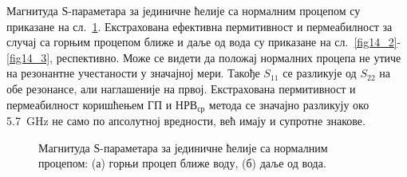 Магнитуда $Ѕ$-параметара за јединичне ћелије са нормалним процепом су приказане на сл.~\ref{fig14_1}. Екстрахована ефективна пермитивност и пермеабилност за случај са горњим процепом ближе и даље од вода су приказане на сл.~\ref{fig14_2}-\ref{fig14_3}, респективно. Може се видети да положај нормалних процепа не утиче на резонантне учестаности у значајној мери. Такође $S_{11}$ се разликује од $S_{22}$ на обе резонансе, али наглашеније на првој. Екстрахована пермитивност и пермеабилност коришћењем ГП и $НРВ_{ср}$ метода се значајно разликују око \SI{5.7}{\giga\hertz} не само по апсолутној вредности, већ имају и супротне знакове.
\begin{figure}[!t]
\centering
{}
\hfill
{}
\caption{Магнитуда $Ѕ$-параметара за јединичне ћелије са нормалним процепом: (а) горњи процеп ближе воду, (б) даље од вода.}
\label{fig14_1}
\end{figure}
